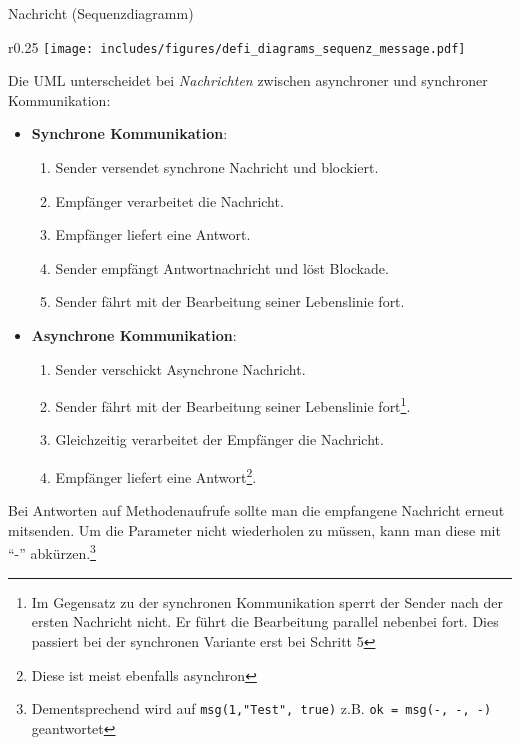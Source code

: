 \begin{diag}{Nachricht (Sequenzdiagramm)}
    \begin{wrapfigure}{r}{0.25\textwidth}
        \centering
        \texttt{[image: includes/figures/defi\_diagrams\_sequenz\_message.pdf]}
    \end{wrapfigure}
    Die UML unterscheidet bei \emph{Nachrichten} zwischen asynchroner und synchroner Kommunikation:
    \begin{itemize}
        \item \textbf{Synchrone Kommunikation}:
              \begin{enumerate}
                  \item Sender versendet synchrone Nachricht und blockiert.
                  \item Empfänger verarbeitet die Nachricht.
                  \item Empfänger liefert eine Antwort.
                  \item Sender empfängt Antwortnachricht und löst Blockade.
                  \item Sender fährt mit der Bearbeitung seiner Lebenslinie fort.
              \end{enumerate}
        \item \textbf{Asynchrone Kommunikation}:
              \begin{enumerate}
                  \item Sender verschickt Asynchrone Nachricht.
                  \item Sender fährt mit der Bearbeitung seiner Lebenslinie fort\footnote{
                            Im Gegensatz zu der synchronen Kommunikation sperrt der Sender nach der ersten Nachricht nicht.
                            Er führt die Bearbeitung parallel nebenbei fort.
                            Dies passiert bei der synchronen Variante erst bei Schritt 5
                        }.
                  \item Gleichzeitig verarbeitet der Empfänger die Nachricht.
                  \item Empfänger liefert eine Antwort\footnote{Diese ist meist ebenfalls asynchron}.
              \end{enumerate}
    \end{itemize}

    Bei Antworten auf Methodenaufrufe sollte man die empfangene Nachricht erneut mitsenden.
    Um die Parameter nicht wiederholen zu müssen, kann man diese mit \enquote{-} abkürzen.\footnote{Dementsprechend wird auf \texttt{msg(1,"Test", true)} z.B. \texttt{ok = msg(-, -, -)} geantwortet}


\end{diag}
